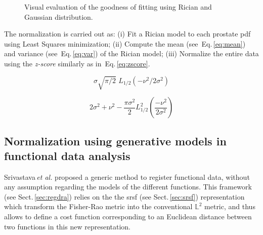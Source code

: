 \begin{figure}
  \centering
  \hfill
  \hfill
  \caption{Visual evaluation of the goodness of fitting using Rician and Gaussian distribution.}
  \label{fig:fitting}
\end{figure}

The normalization is carried out as: 
(i) Fit a Rician model to each prostate \ac{pdf} using Least Squares minimization; 
(ii) Compute the mean (see~Eq.\,\eqref{eq:mean}) and variance (see~Eq.\,\eqref{eq:var}) of the Rician model;
(iii) Normalize the entire data using the \textit{z-score} similarly as in~Eq.\,\eqref{eq:zscore}.

\begin{equation}
  \sigma  \sqrt{\pi/2}\,\,L_{1/2}(-\nu^2/2\sigma^2) 
  \label{eq:mean}
\end{equation}

\begin{equation}
  2\sigma^2+\nu^2-\frac{\pi\sigma^2}{2}L_{1/2}^2\left(\frac{-\nu^2}{2\sigma^2}\right) 
  \label{eq:var}
\end{equation}

\subsection{Normalization using generative models in functional data analysis}

Srivastava\,\textit{et al.}\cite{Srivastava2011} proposed a generic method to register functional data, without any assumption regarding the models of the different functions. This framework (see Sect.\,\ref{sec:regdra}) relies on the the \ac{srsf} (see Sect.\,\ref{sec:srsf}) representation which transform the Fisher-Rao metric into the conventional $\mathbb{L}^2$ metric, and thus allows to define a cost function corresponding to an Euclidean distance between two functions in this new representation.

